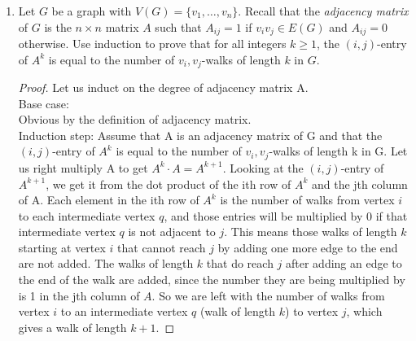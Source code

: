\documentclass[12pt]{article}
\begin{document}
\begin{enumerate}
\begin{proof}
	Let $v_1,v_2,...,v_n$ be the vertices of G, and $d_i$ be the degree of $v_i$. There are $n$ different possible numbers $d_i$ can be, namely $0,...,n-1$. If a vertex has a degree of $n-1$, then it is neighbors to every other vertex, making another vertex having a degree of 0 impossible. So a graph with every degree is impossible, meaning a graph can at most have $n-1$ different $d_i$'s. So by PHP, matching $n$ vertices to $n-1$ degrees must result in 2 vertices having the same degree.
\end{proof}

\medskip

\item Let $G$ be a graph with $V(G) = \{v_1, \ldots, v_n\}$. Recall that the {\em adjacency matrix} of $G$ is the $n \times n$ matrix $A$ such that $A_{ij} = 1$ if $v_iv_j \in E(G)$ and $A_{ij} = 0$ otherwise. Use induction to prove that for all integers $k \geq 1$, the $(i,j)$-entry of $A^k$ is equal to the number of $v_i,v_j$-walks of length $k$ in $G$. 
\begin{proof}
	Let us induct on the degree of adjacency matrix A.\\
	Base case: \\
	Obvious by the definition of adjacency matrix.\medskip\\
	Induction step: Assume that A is an adjacency matrix of G and that the $(i,j)$-entry of $A^k$ is equal to the number of $v_i,v_j$-walks of length k in G. Let us right multiply A to get $A^k\cdot A=A^{k+1}$. Looking at the $(i,j)$-entry of $A^{k+1}$, we get it from the dot product of the ith row of $A^k$ and the jth column of A. Each element in the ith row of $A^k$ is the number of walks from vertex $i$ to each intermediate vertex $q$, and those entries will be multiplied by 0 if that intermediate vertex $q$ is not adjacent to $j$. This means those walks of length $k$ starting at vertex $i$ that cannot reach $j$ by adding one more edge to the end are not added. The walks of length $k$ that do reach $j$ after adding an edge to the end of the walk are added, since the number they are being multiplied by is 1 in the jth column of $A$. So we are left with the number of walks from vertex $i$ to an intermediate vertex $q$ (walk of length $k$) to vertex $j$, which gives a walk of length $k+1$. 
	
\end{proof}

\medskip


\end{enumerate}
\end{document}
